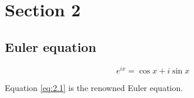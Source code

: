 \section{Section 2} \label{section-2}

\subsection{Euler equation}

\begin{equation} \label{eq:2.1}
e^{ix} = \cos x + i \sin x
\end{equation}


Equation \ref{eq:2.1} is the renowned Euler equation.
